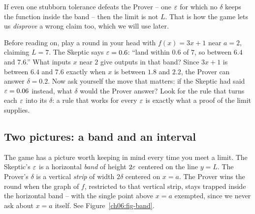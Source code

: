 If even one stubborn tolerance defeats the Prover -- one $\varepsilon$ for which no
$\delta$ keeps the function inside the band -- then the limit is not $L$. That is
how the game lets us \emph{disprove} a wrong claim too, which we will use later.

\begin{walkbox}
Before reading on, play a round in your head with $f(x) = 3x + 1$ near $a = 2$,
claiming $L = 7$. The Skeptic says $\varepsilon = 0.6$: ``land within $0.6$ of $7$, so
between $6.4$ and $7.6$.'' What inputs $x$ near $2$ give outputs in that band?
Since $3x+1$ is between $6.4$ and $7.6$ exactly when $x$ is between $1.8$ and
$2.2$, the Prover can answer $\delta = 0.2$. Now ask yourself the move that
matters: if the Skeptic had said $\varepsilon = 0.06$ instead, what $\delta$ would the
Prover answer? Look for the rule that turns each $\varepsilon$ into its $\delta$: a
rule that works for every $\varepsilon$ is exactly what a proof of the limit supplies.
\end{walkbox}

\subsection{Two pictures: a band and an interval}

The game has a picture worth keeping in mind every time you meet a limit.
The Skeptic's $\varepsilon$ is a horizontal \emph{band} of height $2\varepsilon$ centered on
the line $y = L$. The Prover's $\delta$ is a vertical \emph{strip} of width
$2\delta$ centered on $x = a$. The Prover wins the round when the graph of $f$,
restricted to that vertical strip, stays trapped inside the horizontal band --
with the single point above $x=a$ exempted, since we never ask about $x=a$
itself. See Figure~\ref{ch06:fig-band}.


